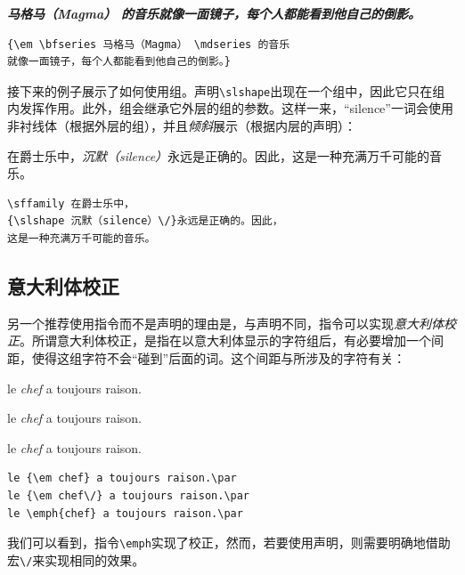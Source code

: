 \begin{codelist}[2.2]{
    {\em \bfseries 马格马（Magma） \mdseries 的音乐就像一面镜子，每个人都能看到他自己的倒影。}
}
    \begin{verbatim}
{\em \bfseries 马格马（Magma） \mdseries 的音乐
就像一面镜子，每个人都能看到他自己的倒影。}
    \end{verbatim}
\end{codelist}

接下来的例子展示了如何使用组。声明\verb|\slshape|出现在一个组中，因此它只在组内发挥作用。此外，组会继承它外层的组的参数。这样一来，“silence”一词会使用\textsf{非衬线}体（根据外层的组），并且\textsl{倾斜}展示（根据内层的声明）：

\begin{codelist}[2.3]{
    \sffamily 在爵士乐中，{\slshape 沉默（silence）\/}永远是正确的。因此，这是一种充满万千可能的音乐。
}\begin{verbatim}\sffamily 在爵士乐中，
{\slshape 沉默（silence）\/}永远是正确的。因此，
这是一种充满万千可能的音乐。
\end{verbatim}
\end{codelist}

\subsection{意大利体校正}

另一个推荐使用指令而不是声明的理由是，与声明不同，指令可以实现\emph{意大利体校正}。所谓意大利体校正，是指在以意大利体显示的字符组后，有必要增加一个间距，使得这组字符不会“碰到”后面的词。这个间距与所涉及的字符有关：

\begin{codelist}[2.4]{
    le {\em chef} a toujours raison.\par
    le {\em chef\/} a toujours raison.\par
    le \emph{chef} a toujours raison.\par
}\begin{verbatim}le {\em chef} a toujours raison.\par
le {\em chef\/} a toujours raison.\par
le \emph{chef} a toujours raison.\par
\end{verbatim}
\end{codelist}

我们可以看到，指令\verb|\emph|实现了校正，然而，若要使用声明，则需要明确地借助宏\verb|\/|来实现相同的效果。

